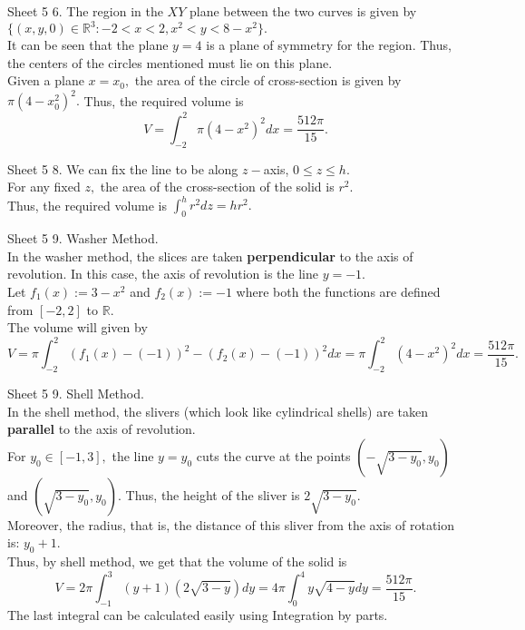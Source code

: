\documentclass[handout, aspectratio=169]{beamer}
\begin{document}
\begin{frame}{Sheet 5}
	6. The region in the $XY$ plane between the two curves is given by $\{(x, y, 0) \in \mathbb{R}^3 : -2 < x < 2, x^2 < y < 8 - x^2\}.$\\
	It can be seen that the plane $y = 4$ is a plane of symmetry for the region. Thus, the centers of the circles mentioned must lie on this plane.\\
	Given a plane $x = x_0,$ the area of the circle of cross-section is given by $\pi(4 - x_0^2)^2.$ Thus, the required volume is
	\[V = \int_{-2}^{2} \pi(4 - x^2)^2 dx = \frac{512\pi}{15}. \]
\end{frame}
\begin{frame}{Sheet 5}
	8. We can fix the line to be along $z-$axis, $0 \le z \le h.$\\
	For any fixed $z,$ the area of the cross-section of the solid is $r^2.$\\
	Thus, the required volume is $\displaystyle\int_{0}^{h} r^2 dz = hr^2.$
\end{frame}
\begin{frame}{Sheet 5}
	9. Washer Method. \\
	In the washer method, the slices are taken \textbf{perpendicular} to the axis of revolution. In this case, the axis of revolution is the line $y = -1.$\\
	Let $f_1(x) := 3 -x^2$ and $f_2(x) := -1$ where both the functions are defined from $[-2, 2]$ to $\mathbb{R}.$ \\
	The volume will given by
	\[V = \pi\int_{-2}^{2} (f_1(x) - (-1))^2 - (f_2(x) - (-1))^2 dx = \pi\int_{-2}^{2} (4 - x^2)^2 dx = \frac{512\pi}{15}. \]
\end{frame}
\begin{frame}{Sheet 5}
	9. Shell Method.\\
	In the shell method, the slivers (which look like cylindrical shells) are taken \textbf{parallel} to the axis of revolution.\\
	For $y_0 \in [-1, 3],$ the line $y = y_0$ cuts the curve at the points $(-\sqrt{3 - y_0}, y_0)$ and $(\sqrt{3 - y_0}, y_0).$ Thus, the height of the sliver is $2\sqrt{3 - y_0}.$\\
	Moreover, the radius, that is, the distance of this sliver from the axis of rotation is: $y_0 + 1.$\\
	Thus, by shell method, we get that the volume of the solid is
	\[V = 2\pi\int_{-1}^{3} (y+1)(2\sqrt{3 - y}) dy = 4\pi\int_{0}^{4} y\sqrt{4 - y} dy = \frac{512\pi}{15}.\]
	The last integral can be calculated easily using Integration by parts.
\end{frame}
\end{document}
